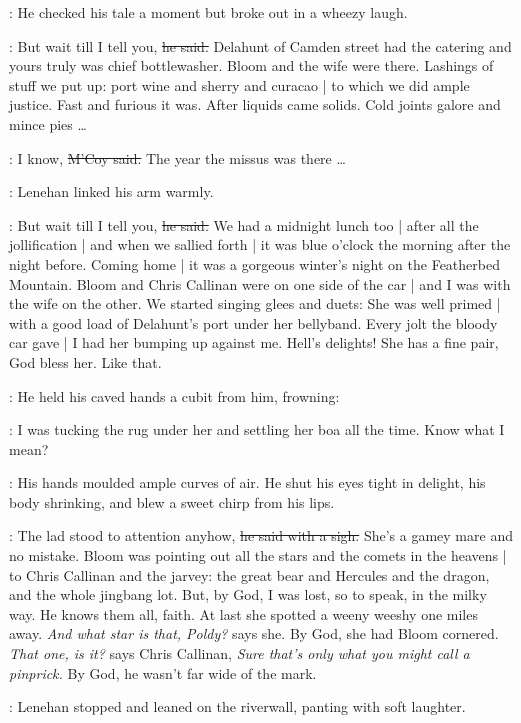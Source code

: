 :
He checked his tale a moment
but broke out in a wheezy laugh.

\lenehan:
But wait till I tell you,
\sout{he said.}
Delahunt of Camden street had the catering
and yours truly was chief bottlewasher.
Bloom and the wife were there.
Lashings of stuff we put up:
port wine and sherry and curacao |
to which we did ample justice.
Fast and furious it was.
After liquids came solids.
Cold joints galore and mince pies \ldots

\mcoy:
I know,
\sout{M'Coy said.}%
The year the missus was there \ldots

:
Lenehan linked his arm warmly.

\lenehan:
But wait till I tell you,
\sout{he said.}
We had a midnight lunch too |
after all the jollification |
and when we sallied forth |
it was blue o'clock the morning after the night before.
Coming home |
it was a gorgeous winter's night on the Featherbed Mountain.
Bloom and Chris Callinan were on one side of the car |
and I was with the wife on the other.
We started singing glees and duets:
She was well primed |
with a good load of Delahunt's port under her bellyband.
Every jolt the bloody car gave |
I had her bumping up against me.
Hell's delights!
She has a fine pair, God bless her.%
Like that.

:
He held his caved hands a cubit from him,
frowning:

\lenehan:
I was tucking the rug under her
and settling her boa all the time.
Know what I mean?

:
His hands moulded ample curves of air.
He shut his eyes tight in delight,
his body shrinking,
and blew a sweet chirp from his lips.

\lenehan:
The lad stood to attention anyhow,
\sout{he said with a sigh.}
She's a gamey mare and no mistake.
Bloom was pointing out all the stars and the comets in the heavens |
to Chris Callinan and the jarvey:
the great bear and Hercules and the dragon,
and the whole jingbang lot.
But, by God, I was lost,
so to speak,
in the milky way.%
He knows them all, faith.
At last she spotted a weeny weeshy one miles away.
\emph{And what star is that, Poldy?}
says she.
By God, she had Bloom cornered.
\emph{That one, is it?}
says Chris Callinan,
\emph{Sure that's only what you might call a pinprick.}
By God, he wasn't far wide of the mark.

:
Lenehan stopped and leaned on the riverwall,
panting with soft laughter.

